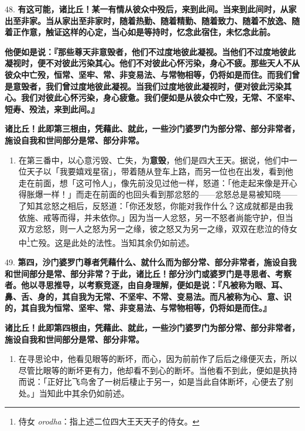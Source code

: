 {\Large 48.} \textbf{有这可能，诸比丘！某一有情从彼众中殁后，来到此间。当来到此间时，从家出至非家。当从家出至非家时，随着热勤、随着精勤、随着致力、随着不放逸、随着正作意，触证这样的心定，当心如是等持时，忆念此宿住，未忆念此前。}

\textbf{他便如是说：『那些尊天非意毁者，他们不过度地彼此凝视。当他们不过度地彼此凝视时，便不对彼此污染其心。他们不对彼此心怀污染，身心不疲。那些天人不从彼众中亡殁，恒常、坚牢、常、非变易法、与常物相等，仍将如是而住。而我们曾是意毁者，我们曾过度地彼此凝视。当我们过度地彼此凝视时，便对彼此污染其心。我们对彼此心怀污染，身心疲惫。我们便如是从彼众中亡殁，无常、不坚牢、短寿、殁法，来到此间。』}

\textbf{诸比丘！此即第三根由，凭藉此、就此，一些沙门婆罗门为部分常、部分非常者，施设自我和世间部分是常、部分非常。}

\begin{enumerate}\item 在第三番中，以心意污毁、亡失，为\textbf{意毁}，他们是四大王天。据说，他们中一位天子以「我要嬉戏星宿」，带着随从登车上路，而另一位也在出发，看到他走在前面，想「这可怜人」，像先前没见过他一样，怒道：「他走起来像是开心得胀爆一样！」而走在前面的也回头看到那忿怒的——忿怒总是易被知晓——了知其忿怒之相后，反怒道：「你还发怒，你能对我作什么？这成就都是由我依施、戒等而得，并未依你。」因为当一人忿怒，另一不怒者尚能守护，但当双方忿怒，则一人之怒为另一之缘，彼之怒又为另一之缘，双双在悲泣的侍女中\footnote{侍女 \textit{orodha}：指上述二位四大王天天子的侍女。}亡殁。这是此处的法性。当知其余仍如前述。\end{enumerate}

{\Large 49.} \textbf{第四，沙门婆罗门尊者凭藉什么、就什么而为部分常、部分非常者，施设自我和世间部分是常、部分非常？于此，诸比丘！部分沙门或婆罗门是寻思者、考察者。他以寻思推导，以考察竞逐，由自身理解，便如是说：『凡被称为眼、耳、鼻、舌、身的，其自我为无常、不坚牢、不常、变易法。而凡被称为心、意、识的，其自我为恒常、坚牢、常、非变易法、与常物相等，仍将如是而住。』}

\textbf{诸比丘！此即第四根由，凭藉此、就此，一些沙门婆罗门为部分常、部分非常者，施设自我和世间部分是常、部分非常。}

\begin{enumerate}\item 在寻思论中，他看见眼等的断坏，而心，因为前前作了后后之缘便灭去，所以尽管比眼等的断坏更有力，他却看不到心的断坏。当他看不到此，便如是执持而说：「正好比飞鸟舍了一树后棲止于另一，如是当此自体断坏，心便去了别处。」当知此中其余仍如前述。\end{enumerate}

